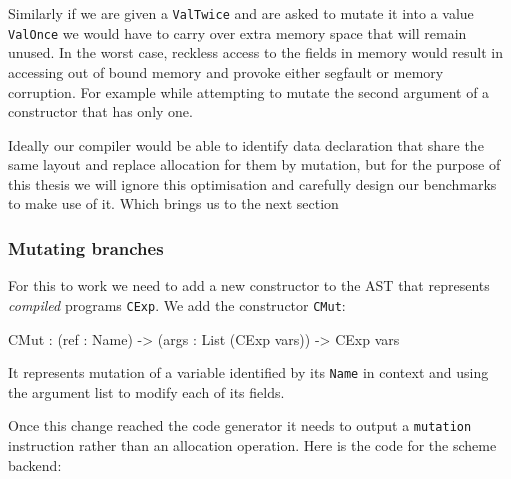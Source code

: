 \documentclass[
]{article}
\newenvironment{Shaded}{}{}
\newcommand{\DataTypeTok}[1]{\textcolor[rgb]{0.56,0.13,0.00}{#1}}
\newcommand{\NormalTok}[1]{#1}
\newcommand{\OperatorTok}[1]{\textcolor[rgb]{0.40,0.40,0.40}{#1}}
\newcommand{\OtherTok}[1]{\textcolor[rgb]{0.00,0.44,0.13}{#1}}
\begin{document}
Similarly if we are given a \texttt{ValTwice} and are asked to mutate it
into a value \texttt{ValOnce} we would have to carry over extra memory
space that will remain unused. In the worst case, reckless access to the
fields in memory would result in accessing out of bound memory and
provoke either segfault or memory corruption. For example while
attempting to mutate the second argument of a constructor that has only
one.

Ideally our compiler would be able to identify data declaration that
share the same layout and replace allocation for them by mutation, but
for the purpose of this thesis we will ignore this optimisation and
carefully design our benchmarks to make use of it. Which brings us to
the next section

\hypertarget{mutating-branches}{%
\subsubsection{Mutating branches}\label{mutating-branches}}

For this to work we need to add a new constructor to the AST that
represents \emph{compiled} programs \texttt{CExp}. We add the
constructor \texttt{CMut}:

\begin{Shaded}
\begin{Highlighting}[]
\DataTypeTok{CMut} \OperatorTok{:}\NormalTok{ (ref }\OperatorTok{:} \DataTypeTok{Name}\NormalTok{) }\OtherTok{{-}\textgreater{}}\NormalTok{ (args }\OperatorTok{:} \DataTypeTok{List}\NormalTok{ (}\DataTypeTok{CExp}\NormalTok{ vars)) }\OtherTok{{-}\textgreater{}} \DataTypeTok{CExp}\NormalTok{ vars }
\end{Highlighting}
\end{Shaded}

It represents mutation of a variable identified by its \texttt{Name} in
context and using the argument list to modify each of its fields.

Once this change reached the code generator it needs to output a
\texttt{mutation} instruction rather than an allocation operation. Here
is the code for the scheme backend:
\end{document}
